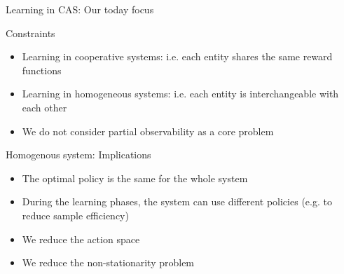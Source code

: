 \documentclass[presentation]{beamer}\mode<presentation>{\usetheme{AMSBolognaFC}}
\begin{document}
\begin{frame}{Learning in CAS: Our today focus}
	\begin{alertblock}{Constraints}
		\begin{itemize}
			\item Learning in cooperative systems: i.e. each entity shares the same reward functions
			\item Learning in homogeneous systems: i.e. each entity is interchangeable with each other
			\item[\faExclamationTriangle] We do not consider partial observability as a core problem
		\end{itemize}
	\end{alertblock}
	\begin{exampleblock}{Homogenous system: Implications}
		\begin{itemize}
			\item[{\color{teal}\faThumbsUp}] The optimal policy is the same for the whole system
			\item[{\color{teal}\faThumbsUp}] During the learning phases, the system can use different policies (e.g. to reduce sample efficiency)
			\item[{\color{teal}\faThumbsUp}] We reduce the action space
			\item[{\color{teal}\faThumbsUp}] We reduce the non-stationarity problem
		\end{itemize}
	\end{exampleblock}
\end{frame}
\end{document}
